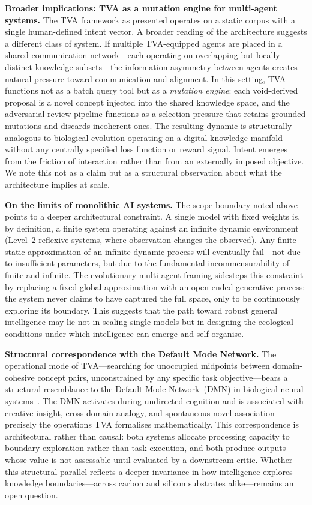 \documentclass[11pt,twocolumn]{article}
\begin{document}
\textbf{Broader implications: TVA as a mutation engine for multi-agent systems.}
The TVA framework as presented operates on a static corpus with a
single human-defined intent vector.  A broader reading of the
architecture suggests a different class of system.  If multiple
TVA-equipped agents are placed in a shared communication network---each
operating on overlapping but locally distinct knowledge subsets---the
information asymmetry between agents creates natural pressure toward
communication and alignment.  In this setting, TVA functions not as a
batch query tool but as a \emph{mutation engine}: each void-derived
proposal is a novel concept injected into the shared knowledge space,
and the adversarial review pipeline functions as a selection pressure
that retains grounded mutations and discards incoherent ones.  The
resulting dynamic is structurally analogous to biological evolution
operating on a digital knowledge manifold---without any centrally
specified loss function or reward signal.  Intent emerges from the
friction of interaction rather than from an externally imposed
objective.  We note this not as a claim but as a structural observation
about what the architecture implies at scale.

\textbf{On the limits of monolithic AI systems.}
The scope boundary noted above points to a deeper architectural
constraint.  A single model with fixed weights is, by definition, a
finite system operating against an infinite dynamic environment
(Level~2 reflexive systems, where observation changes the observed).
Any finite static approximation of an infinite dynamic process will
eventually fail---not due to insufficient parameters, but due to the
fundamental incommensurability of finite and infinite.  The
evolutionary multi-agent framing sidesteps this constraint by replacing
a fixed global approximation with an open-ended generative process: the
system never claims to have captured the full space, only to be
continuously exploring its boundary.  This suggests that the path
toward robust general intelligence may lie not in scaling single models
but in designing the ecological conditions under which intelligence can
emerge and self-organise.

\textbf{Structural correspondence with the Default Mode Network.}
The operational mode of TVA---searching for unoccupied midpoints between
domain-cohesive concept pairs, unconstrained by any specific task
objective---bears a structural resemblance to the Default Mode
Network~(DMN) in biological neural systems~\cite{buckner2008dmn}.
The DMN activates during undirected cognition and is associated with
creative insight, cross-domain analogy, and spontaneous novel
association---precisely the operations TVA formalises mathematically.
This correspondence is architectural rather than causal: both systems
allocate processing capacity to boundary exploration rather than task
execution, and both produce outputs whose value is not assessable until
evaluated by a downstream critic.  Whether this structural parallel
reflects a deeper invariance in how intelligence explores knowledge
boundaries---across carbon and silicon substrates alike---remains an
open question.
\end{document}

